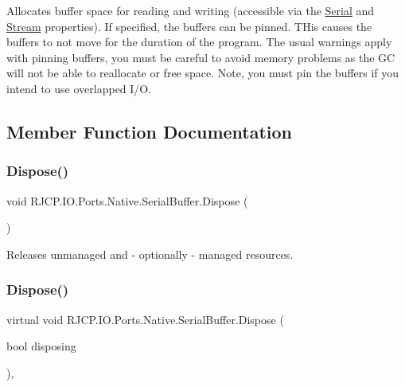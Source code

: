 Allocates buffer space for reading and writing (accessible via the \mbox{\hyperlink{class_r_j_c_p_1_1_i_o_1_1_ports_1_1_native_1_1_serial_buffer_a37599d95e399d497f84c255e95040ee6}{Serial}} and \mbox{\hyperlink{class_r_j_c_p_1_1_i_o_1_1_ports_1_1_native_1_1_serial_buffer_a83712b1cfa86968f5723eec218c5d869}{Stream}} properties). If specified, the buffers can be pinned. T\+His causes the buffers to not move for the duration of the program. The usual warnings apply with pinning buffers, you must be careful to avoid memory problems as the GC will not be able to reallocate or free space. Note, you must pin the buffers if you intend to use overlapped I/O. 

\subsection{Member Function Documentation}
\mbox{\label{class_r_j_c_p_1_1_i_o_1_1_ports_1_1_native_1_1_serial_buffer_aebcd4853ec15a7ee302428598a854173}} 
\subsubsection{\texorpdfstring{Dispose()}{Dispose()}\hspace{0.1cm}{\footnotesize\ttfamily [1/2]}}
{\footnotesize\ttfamily void R\+J\+C\+P.\+I\+O.\+Ports.\+Native.\+Serial\+Buffer.\+Dispose (\begin{DoxyParamCaption}{ }\end{DoxyParamCaption})}



Releases unmanaged and -\/ optionally -\/ managed resources. 

\mbox{\label{class_r_j_c_p_1_1_i_o_1_1_ports_1_1_native_1_1_serial_buffer_ac55fef8b189d4cb839461245f61180db}} 
\subsubsection{\texorpdfstring{Dispose()}{Dispose()}\hspace{0.1cm}{\footnotesize\ttfamily [2/2]}}
{\footnotesize\ttfamily virtual void R\+J\+C\+P.\+I\+O.\+Ports.\+Native.\+Serial\+Buffer.\+Dispose (\begin{DoxyParamCaption}\item[{bool}]{disposing }\end{DoxyParamCaption})\hspace{0.3cm}{\ttfamily [protected]}, {\ttfamily [virtual]}}



